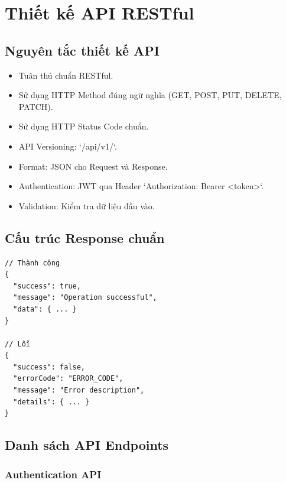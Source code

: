 \documentclass[12pt,a4paper]{report}
\begin{document}
\section{Thiết kế API RESTful}

\subsection{Nguyên tắc thiết kế API}

\begin{itemize}
\item Tuân thủ chuẩn RESTful.
\item Sử dụng HTTP Method đúng ngữ nghĩa (GET, POST, PUT, DELETE, PATCH).
\item Sử dụng HTTP Status Code chuẩn.
\item API Versioning: `/api/v1/`.
\item Format: JSON cho Request và Response.
\item Authentication: JWT qua Header `Authorization: Bearer <token>`.
\item Validation: Kiểm tra dữ liệu đầu vào.
\end{itemize}

\subsection{Cấu trúc Response chuẩn}

\begin{verbatim}
// Thành công
{
  "success": true,
  "message": "Operation successful",
  "data": { ... }
}

// Lỗi
{
  "success": false,
  "errorCode": "ERROR_CODE",
  "message": "Error description",
  "details": { ... }
}
\end{verbatim}

\subsection{Danh sách API Endpoints}

\subsubsection{Authentication API}
\end{document}
